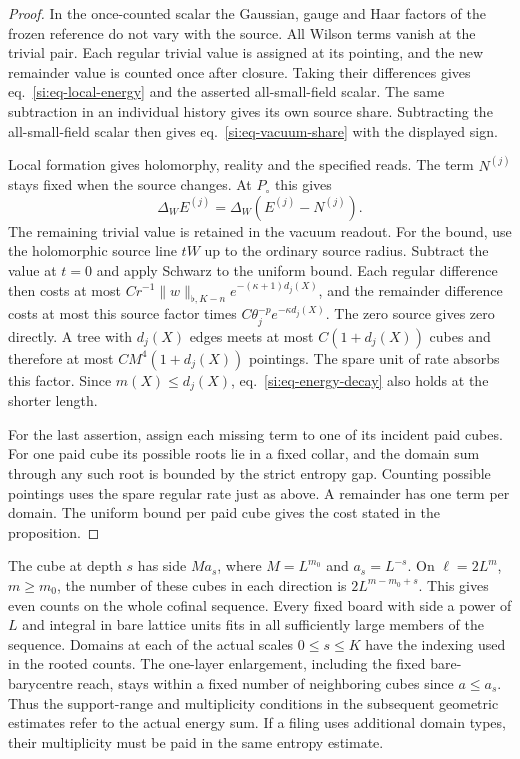 \documentclass[11pt,letterpaper,reqno]{amsart}
\numberwithin{equation}{section}
\renewcommand{\eqref}[1]{\textup{eq.~\ref{#1}}}
\theoremstyle{definition}
\theoremstyle{remark}
\begin{document}
\begin{proof}
In the once-counted scalar the Gaussian, gauge and Haar factors
of the frozen reference do not vary with the source. All Wilson
terms vanish at the trivial pair. Each regular trivial value is
assigned at its pointing, and the new remainder value is counted
once after closure. Taking their differences gives
\eqref{si:eq-local-energy} and the asserted all-small-field scalar.
The same subtraction in an individual history gives its own
source share. Subtracting the all-small-field scalar then gives
\eqref{si:eq-vacuum-share} with the displayed sign.

Local formation gives holomorphy, reality and the specified reads.
The term $N^{(j)}$ stays fixed when the source changes. At
$P_\circ$ this gives
\[
 \Delta_W E^{(j)}=\Delta_W(E^{(j)}-N^{(j)}).
\]
The remaining trivial value is retained in the vacuum readout.
For the bound, use the holomorphic source line
$tW$ up to the ordinary source radius. Subtract the value at
$t=0$ and apply Schwarz to the uniform bound. Each regular
difference then costs at most
$C r^{-1}\|w\|_{\flat,K-n}e^{-(\kappa+1)d_j(X)}$, and the
remainder difference costs at most this source factor times
$C\theta_j^{-p}e^{-\kappa d_j(X)}$. The zero source gives zero
directly. A tree with $d_j(X)$ edges meets at most $C(1+d_j(X))$
cubes and therefore at most $C M^4(1+d_j(X))$ pointings. The
spare unit of rate absorbs this factor. Since $m(X)\le d_j(X)$,
\eqref{si:eq-energy-decay} also holds at the shorter length.

For the last assertion, assign each missing term to one of its
incident paid cubes. For one paid cube its possible roots lie
in a fixed collar, and the domain sum through any such root is
bounded by the strict entropy gap. Counting possible pointings
uses the spare regular rate just as above. A remainder has one
term per domain. The uniform bound per paid cube gives the cost
stated in the proposition.
\end{proof}

The cube at depth $s$ has side $M a_s$, where $M=L^{m_0}$ and
$a_s=L^{-s}$. On $\ell=2L^m$, $m\ge m_0$, the number of these cubes
in each direction is $2L^{m-m_0+s}$. This gives even counts on the
whole cofinal sequence. Every fixed board with side a power of
$L$ and integral in bare lattice units fits in all sufficiently
large members of the sequence. Domains at each of the actual
scales $0\le s\le K$ have the indexing used in the rooted counts.
The one-layer enlargement, including the fixed bare-barycentre
reach, stays within a fixed number of neighboring cubes since
$a\le a_s$. Thus the support-range and multiplicity conditions
in the subsequent geometric estimates refer to the actual energy
sum. If a filing uses additional domain types, their multiplicity
must be paid in the same entropy estimate.
\end{document}
